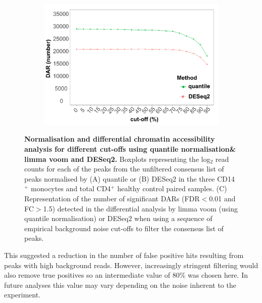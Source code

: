\begin{figure}[ht]
\begin{subfigure}{0.5\textwidth}
\includegraphics[width=\textwidth]{./Results1/pdfs/ATAC_Core_CD4vsCD14_DOC_FDR_01_vs_cutoffs_quantile_DESeq2_only}
\caption{\textbf{}}
\end{subfigure}

\caption[Normalisation and differential chromatin accessibility analysis for different cut-offs using quantile normalisation limma voom and DESeq2.]{\textbf{Normalisation and differential chromatin accessibility analysis for different cut-offs using quantile normalisation\& limma voom and DESeq2.} Boxplots representing the log$_2$  read counts for each of the peaks from the unfiltered consensus list of peaks normalised by (A) quantile or (B) DESeq2 in the three CD14$^+$ monocytes and total CD4$^+$  healthy control paired samples. (C) Representation of the number of significant DARs (FDR$<$0.01 and FC$>$1.5) detected in the differential analysis by limma voom (using quantile normalisation) or DESeq2 when using a sequence of empirical background noise cut-offs to filter the consensus list of peaks.}
\label{figure:ATAC_normalisation_and_DARs_limma_DESeq2}
\end{figure} 

This suggested a reduction in the number of false positive hits resulting from peaks with high background reads. However, increasingly stringent filtering would also remove true positives so an intermediate value of 80\% was chosen here. In future analyses this value may vary depending on the noise inherent to the experiment.



